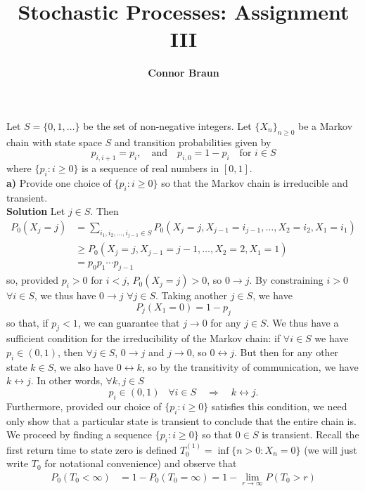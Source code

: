 \documentclass[11pt, letterpaper]{article}
\title{\bf Stochastic Processes: Assignment III}
\author{\bf Connor Braun}
\date{}
\begin{document}
 
    \maketitle
     Let $S=\{0,1,\dots\}$ be the set of non-negative integers. Let $\{X_n\}_{n\geq 0}$ be a Markov chain with state space $S$ and transition probabilities given by
    \[p_{i,i+1}=p_i,\quad\text{and}\quad p_{i,0}=1-p_i\quad\text{for $i\in S$}\]
    where $\{p_i:i\geq 0\}$ is a sequence of real numbers in $[0,1]$.\\[10pt]
    {\bf a)} Provide one choice of $\{p_i:i\geq 0\}$ so that the Markov chain is irreducible and transient.\\[10pt]
    {\bf Solution} Let $j\in S$. Then 
    \begin{align*}
        P_0(X_j=j)&=\sum_{i_1,i_2,\dots,i_{j-1}\in S}P_0(X_j=j,X_{j-1}=i_{j-1},\dots,X_2=i_2,X_1=i_1)\\
        &\geq P_0(X_j=j,X_{j-1}=j-1,\dots,X_2=2,X_1=1)\\
        &=p_0p_1\cdots p_{j-1}
    \end{align*}
    so, provided $p_i>0$ for $i< j$, $P_0(X_j=j)>0$, so $0\longrightarrow j$. By constraining $i>0$ $\forall i\in S$, we thus have $0\longrightarrow j$ $\forall j\in S$. Taking another $j\in S$, we have
    \[P_j(X_1=0)=1-p_j\]
    so that, if $p_j <1$, we can guarantee that $j\longrightarrow 0$ for any $j\in S$. We thus have a sufficient condition for the irreducibility of the Markov chain: if $\forall i\in S$ we have $p_i\in(0,1)$, then $\forall j\in S$, $0\longrightarrow j$ and $j\longrightarrow 0$, so $0\longleftrightarrow j$.
    But then for any other state $k\in S$, we also have $0\longleftrightarrow k$, so by the transitivity of communication, we have $k\longleftrightarrow j$. In other words, $\forall k,j\in S$
    \[p_i\in(0,1)\;\;\;\forall i\in S\quad\Rightarrow\quad k\longleftrightarrow j.\]
    Furthermore, provided our choice of $\{p_i:i\geq 0\}$ satisfies this condition, we need only show that a particular state is transient to conclude that the entire chain is.\\[10pt]
    We proceed by finding a sequence $\{p_i:i\geq 0\}$ so that $0\in S$ is transient. Recall the first return time to state zero is defined $T_0^{(1)}=\inf\{n>0:X_n=0\}$ (we will just write $T_0$ for notational convenience) and observe that
    \begin{align*}
        P_0(T_0<\infty)&=1-P_0(T_0=\infty)=1-\lim_{r\rightarrow\infty}P(T_0>r)
    \end{align*}
\end{document}
